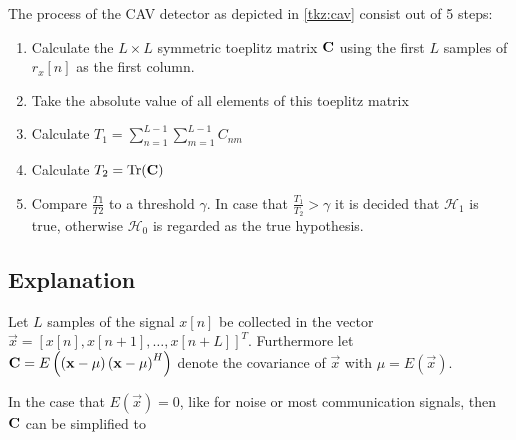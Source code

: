 \documentclass[a4paper, openany, oneside]{memoir}
\begin{document}
The process of the CAV detector as depicted  in \cref{tkz:cav} consist out of 5 steps:
\begin{enumerate}
	\item Calculate the $L\times L$ symmetric toeplitz matrix $\boldsymbol{\mathbf{C}}$ using the first $L$ samples of $r_x[n]$ as the first column.
	\item Take the absolute value of all elements of this toeplitz matrix
	\item Calculate $T_1 = \sum_{n=1}^{L-1}\sum_{m=1}^{L-1} C_{nm}$
	\item Calculate $T_2 = \text{Tr}(\boldsymbol{\mathbf{C}})$
	\item Compare $\frac{T1}{T2}$ to a threshold $\gamma$. In case that $\frac{T_1}{T_2} > \gamma$ it is decided that $\mathcal{H}_1$ is true, otherwise $\mathcal{H}_0$ is regarded as the true hypothesis. 
\end{enumerate}

\subsection{Explanation}
Let $L$ samples of the signal $x[n]$ be collected in the vector $\vec{x} = \left[x[n], x[n+1], \ldots, x[n+L]\right]^T$. 
Furthermore let $\boldsymbol{\mathbf{C}} = E\left(\left(\boldsymbol{\mathbf{x}} - \mu \right)\left(\boldsymbol{\mathbf{x}} - \mu \right)^H\right)$ denote the covariance of $\vec{x}$ with $\mu = E(\vec{x})$.

In the case that $E\left(\vec{x}\right)=0$, like for noise or most communication signals, then $\boldsymbol{\mathbf{C}}$ can be simplified to
\end{document}
